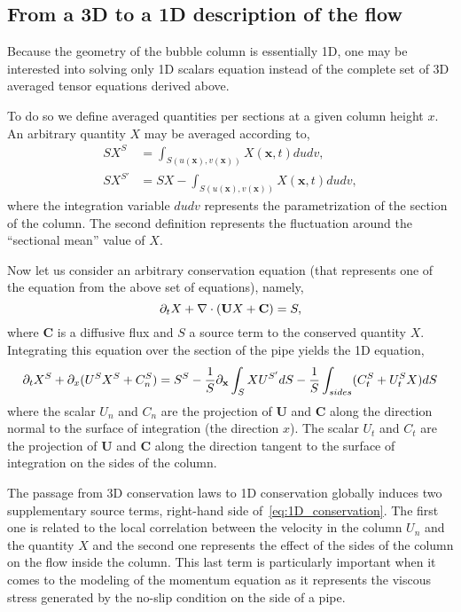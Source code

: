 \subsection{From a 3D to a 1D description of the flow}

Because the geometry of the bubble column is essentially 1D, one may be interested into solving only 1D scalars equation instead of the complete set of 3D averaged tensor equations derived above. 

To do so we define averaged quantities per sections at a given column height $x$.
An arbitrary quantity $X$ may be averaged according to, 
\begin{align*}
    S X^S &= \int_{S(u(\textbf{x}),v(\textbf{x}))} X(\textbf{x},t)dudv,\\
    S X^{S'} &=S  X - \int_{S(u(\textbf{x}),v(\textbf{x}))} X(\textbf{x},t)dudv,
\end{align*}
where the integration variable $dudv$ represents the parametrization of the section of the column.  
The second definition represents the fluctuation around the ``sectional mean'' value of $X$. 

Now let us consider an arbitrary conservation equation (that represents one of the equation from the above set of equations), namely,
\begin{equation}
    \partial_t X + \mathbf{\nabla}\cdot(\textbf{U} X + \textbf{C}) = S,
\end{equation}
where $\textbf{C}$ is a diffusive flux and $S$ a source term to the conserved quantity $X$. 
Integrating this equation over the section of the pipe yields the 1D equation, 
\begin{equation}
    \pddt X^S + \partial_x(U^S X^S +  C_n^S) 
    = S^S
    - \frac{1}{S}\pddx\int_S X U^{S'}dS
    - \frac{1}{S}\int_{sides}( C_t^S+U_t^S X )dS 
    \label{eq:1D_conservation}
\end{equation}
where the scalar ${U}_n$ and $C_n$ are the projection of $\textbf{U}$ and $\textbf{C}$ along the direction normal to the surface of integration (the direction $x$). 
The scalar ${U}_t$ and $C_t$ are the projection of $\textbf{U}$ and $\textbf{C}$ along the direction tangent to the surface of integration on the sides of the column. 

The passage from 3D conservation laws to 1D conservation globally induces two supplementary source terms, right-hand side of~\ref{eq:1D_conservation}. 
The first one is related to the local correlation between the velocity in the column $U_n$ and the quantity $X$ and the second one represents the effect of the sides of the column on the flow inside the column. 
This last term is particularly important when it comes to the modeling of the momentum equation as it represents the viscous stress generated by the no-slip condition on the side of a pipe. 

